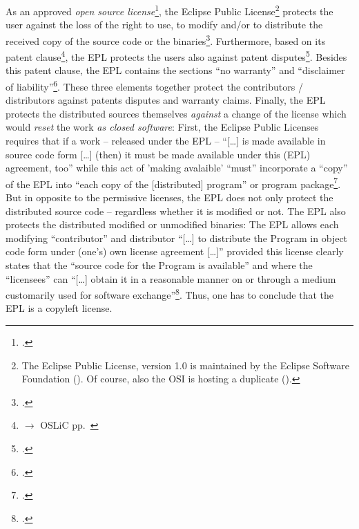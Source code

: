 As an approved \emph{open source license}\footcite[cf.][\nopage wp]{OSI2012b},
the Eclipse Public License\footnote{ The Eclipse Public License, version 1.0 is
maintained by the Eclipse Software Foundation (\cite[cf.][\nopage
wp]{Epl10EclipseFoundation2005a}).  Of course, also the OSI is hosting a
duplicate (\cite[cf.][\nopage wp]{Epl10OsiLicense2005a}).} protects the user
against the loss of the right to use, to modify and/or to distribute the
received copy of the source code or the binaries\footcite[cf.][\nopage wp. 
§2a]{Epl10OsiLicense2005a}. Furthermore, based on its patent
clause\footnote{$\rightarrow$ OSLiC pp.\ \pageref{subsec:EpLPatentClause}}, the
EPL protects the users also against patent disputes\footcite[cf.][\nopage wp. §2b
\& §2c]{Epl10OsiLicense2005a}. Besides this patent clause, the EPL contains the
sections \enquote{no warranty} and \enquote{disclaimer of
liability}\footcite[cf.][\nopage wp. §5 \& §6]{Epl10OsiLicense2005a}. These three
elements together protect the contributors / distributors against patents
disputes and warranty claims. Finally, the EPL protects the distributed sources
themselves \emph{against} a change of the license which would \emph{reset} the
work \emph{as closed software}: First, the Eclipse Public Licenses requires that
if a work -- released under the EPL -- \enquote{[\ldots] is made available in
source code form [\ldots] (then) it must be made available under this (EPL)
agreement, too} while this act of 'making avalaible' \enquote{must} incorporate
a \enquote{copy} of the EPL into \enquote{each copy of the [distributed]
program} or program package\footcite[cf.][\nopage wp. §3]{Epl10OsiLicense2005a}.
But in opposite to the permissive licenses, the EPL does not only protect the
distributed source code -- regardless whether it is modified or not. The EPL
also protects the distributed modified or unmodified binaries: The EPL allows
each modifying \enquote{contributor} and distributor \enquote{[\ldots] to
distribute the Program in object code form under (one's) own license agreement
[\ldots]} provided this license clearly states that the \enquote{source code for
the Program is available} and where the \enquote{licensees} can
\enquote{[\ldots] obtain it in a reasonable manner on or through a medium
customarily used for software exchange}\footcite[cf.][\nopage wp. §3, esp.
§3.b.iv]{Epl10OsiLicense2005a}. Thus, one has to conclude that the EPL is a
copyleft license.

